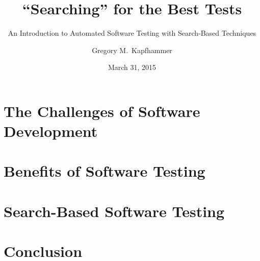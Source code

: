\documentclass[hyperref]{beamer}
\title{``Searching'' for the Best Tests}
\subtitle{An Introduction to Automated Software Testing with Search-Based Techniques}
\author[G.M. Kapfhammer]{Gregory M.\ Kapfhammer}
\institute[Allegheny College]{Department of Computer Science\\ Allegheny College}
\date[Feb 23, 2015]{March 31, 2015}
\begin{document}
\begin{frame}
  \titlepage
\end{frame}



\section{The Challenges of Software Development}
\label{sec:challenge-software}



\section{Benefits of Software Testing}
\label{sec:intr-softw-test}



\section{Search-Based Software Testing}
\label{sec:search-based-software-testing}



\section{Conclusion}
\label{sec:conclusion}


\end{document}

